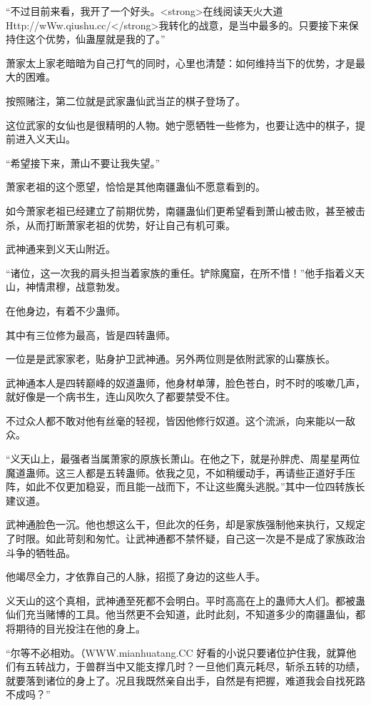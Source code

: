 
\begin{this_body}

“不过目前来看，我开了一个好头。<strong>在线阅读天火大道Http://wWw.qiushu.cc/</strong>我转化的战意，是当中最多的。只要接下来保持住这个优势，仙蛊屋就是我的了。”

萧家太上家老暗暗为自己打气的同时，心里也清楚：如何维持当下的优势，才是最大的困难。

按照赌注，第二位就是武家蛊仙武当芷的棋子登场了。

这位武家的女仙也是很精明的人物。她宁愿牺牲一些修为，也要让选中的棋子，提前进入义天山。

“希望接下来，萧山不要让我失望。”

萧家老祖的这个愿望，恰恰是其他南疆蛊仙不愿意看到的。

如今萧家老祖已经建立了前期优势，南疆蛊仙们更希望看到萧山被击败，甚至被击杀，从而打断萧家老祖的优势，好让自己有机可乘。

武神通来到义天山附近。

“诸位，这一次我的肩头担当着家族的重任。铲除魔窟，在所不惜！”他手指着义天山，神情肃穆，战意勃发。

在他身边，有着不少蛊师。

其中有三位修为最高，皆是四转蛊师。

一位是是武家家老，贴身护卫武神通。另外两位则是依附武家的山寨族长。

武神通本人是四转巅峰的奴道蛊师，他身材单薄，脸色苍白，时不时的咳嗽几声，就好像是一个病书生，连山风吹久了都要禁受不住。

不过众人都不敢对他有丝毫的轻视，皆因他修行奴道。这个流派，向来能以一敌众。

“义天山上，最强者当属萧家的原族长萧山。在他之下，就是孙胖虎、周星星两位魔道蛊师。这三人都是五转蛊师。依我之见，不如稍缓动手，再请些正道好手压阵，如此不仅更加稳妥，而且能一战而下，不让这些魔头逃脱。”其中一位四转族长建议道。

武神通脸色一沉。他也想这么干，但此次的任务，却是家族强制他来执行，又规定了时限。如此苛刻和匆忙。让武神通都不禁怀疑，自己这一次是不是成了家族政治斗争的牺牲品。

他竭尽全力，才依靠自己的人脉，招揽了身边的这些人手。

义天山的这个真相，武神通至死都不会明白。平时高高在上的蛊师大人们。都被蛊仙们充当赌博的工具。他当然更不会知道，此时此刻，不知道多少的南疆蛊仙，都将期待的目光投注在他的身上。

“尔等不必相劝。（WWW.mianhuatang.CC 好看的小说只要诸位护住我，就算他们有五转战力，于兽群当中又能支撑几时？一旦他们真元耗尽，斩杀五转的功绩，就要落到诸位的身上了。况且我既然亲自出手，自然是有把握，难道我会自找死路不成吗？”


\end{this_body}

